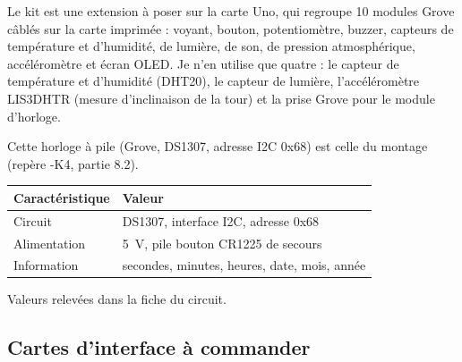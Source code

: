 \noindent Le kit est une extension à poser sur la carte Uno, qui regroupe 10 modules Grove câblés sur la carte imprimée : voyant, bouton, potentiomètre, buzzer, capteurs de température et d'humidité, de lumière, de son, de pression atmosphérique, accéléromètre et écran OLED. Je n'en utilise que quatre : le capteur de température et d'humidité (DHT20), le capteur de lumière, l'accéléromètre LIS3DHTR (mesure d'inclinaison de la tour) et la prise Grove pour le module d'horloge.

\noindent Cette horloge à pile (Grove, DS1307, adresse I2C 0x68) est celle du montage (repère -K4, partie 8.2).

\noindent
\begin{table}[H]
\centering
\begin{tabularx}{\linewidth}{lY}
\hline
Caractéristique & Valeur \\
\hline
Circuit & DS1307, interface I2C, adresse 0x68 \\
Alimentation & \qty{5}{V}, pile bouton CR1225 de secours \\
Information & secondes, minutes, heures, date, mois, année \\
\hline
\end{tabularx}
\end{table}
Valeurs relevées dans la fiche du circuit.

\subsection*{Cartes d'interface à commander}

